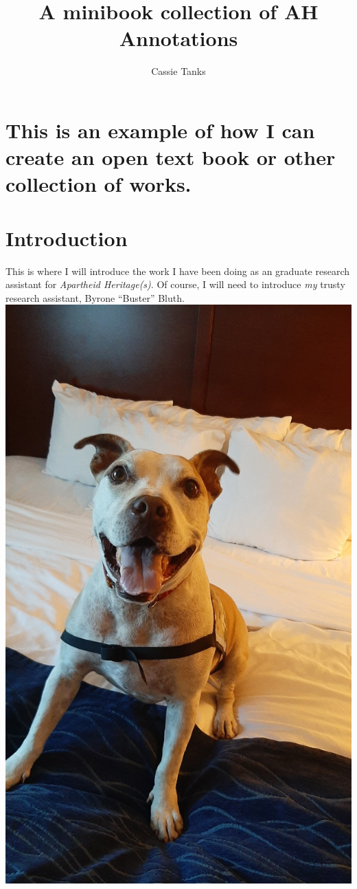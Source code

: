 \documentclass[
  openany]{book}
\title{A minibook collection of AH Annotations}
\author{Cassie Tanks}
\date{}
\begin{document}
\maketitle

{
\setcounter{tocdepth}{1}
\tableofcontents
}
\hypertarget{this-is-an-example-of-how-i-can-create-an-open-text-book-or-other-collection-of-works.}{%
\chapter{This is an example of how I can create an open text book or other collection of works.}\label{this-is-an-example-of-how-i-can-create-an-open-text-book-or-other-collection-of-works.}}

\hypertarget{introduction}{%
\chapter{Introduction}\label{introduction}}

This is where I will introduce the work I have been doing as an graduate research assistant for \emph{Apartheid Heritage(s)}. Of course, I will need to introduce \emph{my} trusty research assistant, Byrone ``Buster'' Bluth.
\includegraphics{202006_Buster_Hotel.jpg}
\end{document}
